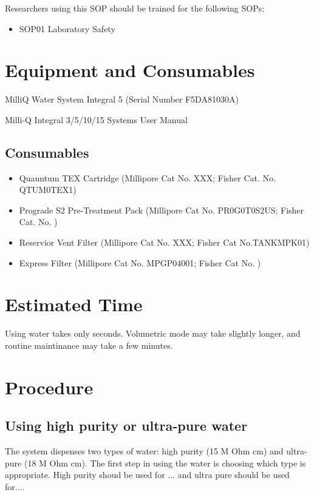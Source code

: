 \documentclass[12pt]{../SOP3_beta}\usepackage[]{graphicx}\usepackage[]{color}
\begin{document}
\NP Researchers using this SOP should be trained for the following SOPs:

\begin{itemize}
  \item SOP01 Laboratory Safety
\end{itemize}

\section{Equipment and Consumables}

\NP MilliQ Water System Integral 5 (Serial Number F5DA81030A)

\NP Milli-Q Integral 3/5/10/15 Systems User Manual

\subsection{Consumables}

\begin{itemize}
  \item Quauntum TEX Cartridge (Millipore Cat No. XXX; Fisher Cat. No. QTUM0TEX1)
  \item Prograde S2 Pre-Treatment Pack (Millipore Cat No. PR0G0T0S2US; Fisher Cat. No. ) 
  \item Reservior Vent Filter (Millipore Cat No. XXX; Fisher Cat No.TANKMPK01)
  \item Express Filter (Millipore Cat No. MPGP04001; Fisher Cat No. )
\end{itemize}


\section{Estimated Time}

\NP Using water takes only seconds. Volumetric mode may take slightly longer, and routine maintinance may take a few minutes. 

\section{Procedure}

\subsection{Using high purity or ultra-pure water}

\NP The system dispenses two types of water: high purity (15 M Ohm cm) and ultra-pure (18 M Ohm cm). The first step in using the water is choosing which type is appropriate. High purity shoud be used for ... and ultra pure should be used for....
\end{document}
